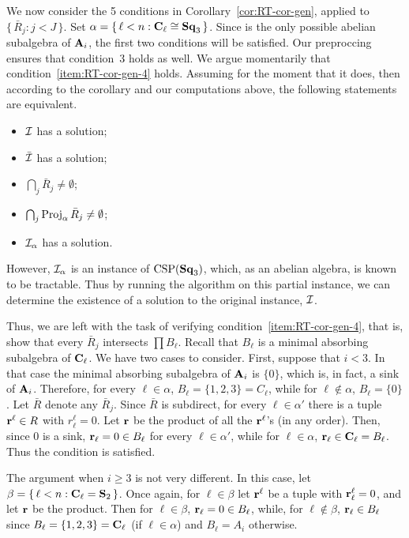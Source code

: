 We now consider the 5 conditions in Corollary~\ref{cor:RT-cor-gen}, applied to $\{\,\bar R_j : j<J\,\}$. Set $\alpha=\{\,\ell<n : \mathbf{C}_\ell \cong \mathbf{Sq}_{3}\,\}$. Since  is the only possible abelian subalgebra of $\mathbf{A}_i$, the first two conditions will be satisfied. Our preproccing ensures that condition~3 holds as well. We argue momentarily that condition~\ref{item:RT-cor-gen-4} holds. Assuming for the moment that it does, then according to the corollary and our computations above, the following statements are equivalent.
\begin{itemize}
\item $\mathcal{I}$ has a solution;
\item $\bar {\mathcal{I}}$ has a solution;
\item $\bigcap_j \bar R_j \neq \emptyset$;
\item $\bigcap_j \operatorname{Proj}_\alpha \bar R_j \neq \emptyset$;
\item $\mathcal{I}_\alpha$ has a solution.
\end{itemize}
However, $\mathcal{I}_\alpha$ is an instance of $\operatorname{CSP}(\mathbf{Sq}_{3})$, which, as an abelian algebra, is known to be tractable. Thus by running the algorithm on this partial instance, we can determine the existence of a solution to the original instance, $\mathcal{I}$.

Thus, we are left with the task of verifying condition~\ref{item:RT-cor-gen-4}, that is, show that every $\bar R_j$ intersects $\prod B_\ell$. Recall that $B_\ell$ is a minimal absorbing subalgebra of $\mathbf{C}_\ell$. We have two cases to consider. First, suppose that $i<3$. In that case the minimal absorbing subalgebra of $\mathbf{A}_i$ is $\{0\}$, which is, in fact, a sink of $\mathbf{A}_i$. Therefore, for every $\ell \in \alpha$, $B_\ell = \{1,2,3\}= C_\ell$, while for $\ell \notin \alpha$, $B_\ell = \{0\}$. Let $\bar R$ denote any $\bar R_j$. Since $\bar R$ is subdirect, for every $\ell \in \alpha'$ there is a tuple $\mathbf{r}^\ell \in R$ with $r^\ell_\ell = 0$. Let $\mathbf{r}$ be the product of all the $\mathbf{r}^\ell$'s (in any order). Then, since $0$ is a sink, $\mathbf{r}_\ell = 0\in B_\ell$ for every $\ell \in \alpha'$, while for $\ell \in \alpha$, $\mathbf{r}_\ell \in \mathbf{C}_\ell = B_\ell$. Thus the condition is satisfied.

The argument when $i\geq 3$ is not very different. In this case, let $\beta = \{\,\ell <n : \mathbf{C}_\ell = \mathbf S_2\,\}$. Once again, for $\ell \in \beta$ let $\mathbf{r}^\ell$ be a tuple with $\mathbf{r}^\ell_\ell = 0$, and let $\mathbf{r}$ be the product. Then for $\ell \in \beta$, $\mathbf{r}_\ell = 0 \in B_\ell$, while, for $\ell \notin \beta$, $\mathbf{r}_\ell \in B_\ell$ since $B_\ell = \{1,2,3\} = \mathbf{C}_\ell$ (if $\ell \in \alpha$) and $B_\ell = A_i$ otherwise. 



